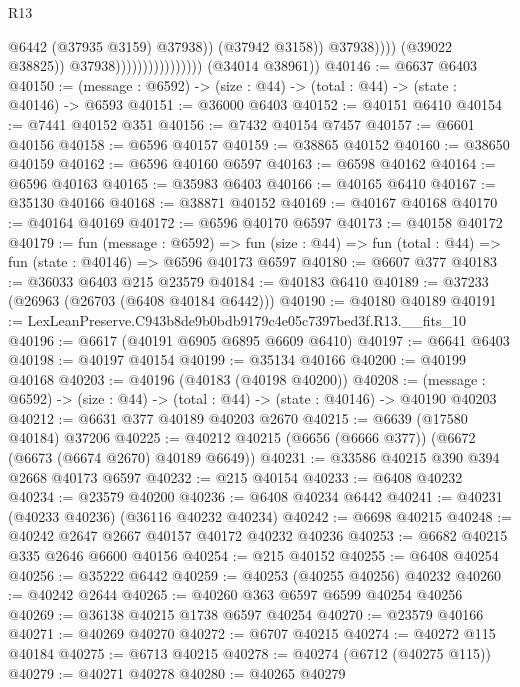 \begin{lexlean}{R13}
\begin{coremodule}
                                                      @6442
                                                      (@37935 @3159)
                                                      @37938))
                                                  (@37942 @3158))
                                                @37938))))
                                        (@39022 @38825))
                                      @37938))))))))))))))))
      (@34014 @38961))
@40146 := @6637 @6403
@40150 := (message : @6592) -> (size : @44) -> (total : @44) -> (state : @40146) -> @6593
@40151 := @36000 @6403
@40152 := @40151 @6410
@40154 := @7441 @40152 @351
@40156 := @7432 @40154 @7457
@40157 := @6601 @40156
@40158 := @6596 @40157
@40159 := @38865 @40152
@40160 := @38650 @40159
@40162 := @6596 @40160 @6597
@40163 := @6598 @40162
@40164 := @6596 @40163
@40165 := @35983 @6403
@40166 := @40165 @6410
@40167 := @35130 @40166
@40168 := @38871 @40152
@40169 := @40167 @40168
@40170 := @40164 @40169
@40172 := @6596 @40170 @6597
@40173 := @40158 @40172
@40179 := fun (message : @6592) =>
  fun (size : @44) => fun (total : @44) => fun (state : @40146) => @6596 @40173 @6597
@40180 := @6607 @377
@40183 := @36033 @6403 @215 @23579
@40184 := @40183 @6410
@40189 := @37233 (@26963 (@26703 (@6408 @40184 @6442)))
@40190 := @40180 @40189
@40191 := LexLeanPreserve.C943b8de9b0bdb9179c4e05c7397bed3f.R13.__fits_10
@40196 := @6617 (@40191 @6905 @6895 @6609 @6410)
@40197 := @6641 @6403
@40198 := @40197 @40154
@40199 := @35134 @40166
@40200 := @40199 @40168
@40203 := @40196 (@40183 (@40198 @40200))
@40208 := (message : @6592) -> (size : @44) -> (total : @44) -> (state : @40146) -> @40190 @40203
@40212 := @6631 @377 @40189 @40203 @2670
@40215 := @6639 (@17580 @40184) @37206
@40225 := @40212 @40215 (@6656 (@6666 @377)) (@6672 (@6673 (@6674 @2670) @40189 @6649))
@40231 := @33586 @40215 @390 @394 @2668 @40173 @6597
@40232 := @215 @40154
@40233 := @6408 @40232
@40234 := @23579 @40200
@40236 := @6408 @40234 @6442
@40241 := @40231 (@40233 @40236) (@36116 @40232 @40234)
@40242 := @6698 @40215
@40248 := @40242 @2647 @2667 @40157 @40172 @40232 @40236
@40253 := @6682 @40215 @335 @2646 @6600 @40156
@40254 := @215 @40152
@40255 := @6408 @40254
@40256 := @35222 @6442
@40259 := @40253 (@40255 @40256) @40232
@40260 := @40242 @2644
@40265 := @40260 @363 @6597 @6599 @40254 @40256
@40269 := @36138 @40215 @1738 @6597 @40254
@40270 := @23579 @40166
@40271 := @40269 @40270
@40272 := @6707 @40215
@40274 := @40272 @115 @40184
@40275 := @6713 @40215
@40278 := @40274 (@6712 (@40275 @115))
@40279 := @40271 @40278
@40280 := @40265 @40279

\end{coremodule}
\end{lexlean}
